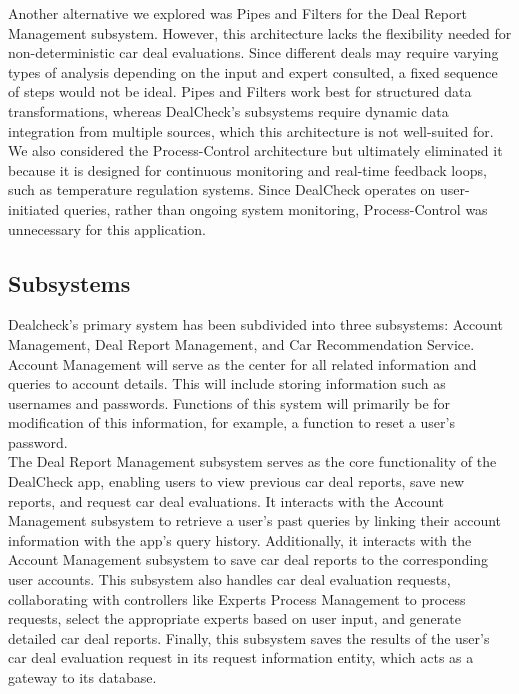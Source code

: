\documentclass[]{article}
\begin{document}
Another alternative we explored was Pipes and Filters for the Deal Report Management subsystem. However, this architecture lacks the flexibility needed for non-deterministic car deal evaluations. Since different deals may require varying types of analysis depending on the input and expert consulted, a fixed sequence of steps would not be ideal. Pipes and Filters work best for structured data transformations, whereas DealCheck's subsystems require dynamic data integration from multiple sources, which this architecture is not well-suited for.\\

We also considered the Process-Control architecture but ultimately eliminated it because it is designed for continuous monitoring and real-time feedback loops, such as temperature regulation systems. Since DealCheck operates on user-initiated queries, rather than ongoing system monitoring, Process-Control was unnecessary for this application.\\

\subsection{Subsystems}
\label{sub:subsystems}

Dealcheck’s primary system has been subdivided into three subsystems: Account Management, Deal Report Management, and Car Recommendation Service. \\

Account Management will serve as the center for all related information and queries to account details. This will include storing information such as usernames and passwords. Functions of this system will primarily be for modification of this information, for example, a function to reset a user’s password. \\

The Deal Report Management subsystem serves as the core functionality of the DealCheck app, enabling users to view previous car deal reports, save new reports, and request car deal evaluations. It interacts with the Account Management subsystem to retrieve a user's past queries by linking their account information with the app's query history. Additionally, it interacts with the Account Management subsystem to save car deal reports to the corresponding user accounts. This subsystem also handles car deal evaluation requests, collaborating with controllers like Experts Process Management to process requests, select the appropriate experts based on user input, and generate detailed car deal reports. Finally, this subsystem saves the results of the user's car deal evaluation request in its request information entity, which acts as a gateway to its database. \\
\end{document}
